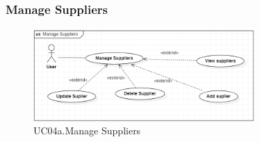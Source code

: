 \documentclass[../thesis.tex]{subfiles}
\begin{document}
\subsubsection{Manage Suppliers}
\begin{figure}[H]
    \centering
    \includegraphics[width=0.75\textwidth]{images/UCD_ManageSuppliers.png}
    \caption{UC04a.Manage Suppliers}
    \label{fig:UCD-manage-suppliers}
\end{figure}
\end{document}
